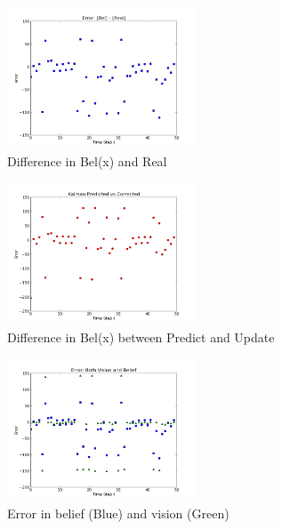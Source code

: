\begin{figure}[tbd]
\includegraphics[width=0.5\textwidth]{images/bel_vs_real.png}
\caption{\label{bel_vs_real} Difference in Bel(x) and Real}
\end{figure}

\begin{figure}[tbd]
\includegraphics[width=0.5\textwidth]{images/pre_vs_cor.png}
\caption{\label{pre_vs_cor} Difference in Bel(x) between Predict and Update}
\end{figure}

\begin{figure}[tbd]
\includegraphics[width=0.5\textwidth]{images/both_vision_belief.png}
\caption{\label{both_vision_belief} Error in belief (Blue) and vision (Green)}
\end{figure}



